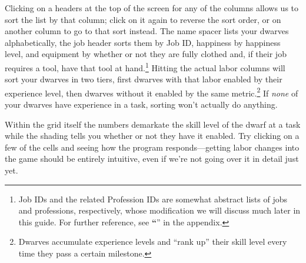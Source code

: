 \documentclass[]{article}
\newcommand{\jump}[1] {\textbf{``\nameref{sec:#1}}''}
\begin{document}
Clicking on a headers at the top of the screen for any of the columns allows us to sort the list by that
column; click on it again to reverse the sort order, or on another column to go to that sort instead.
The name spacer lists your dwarves alphabetically, the job header sorts them by Job ID, happiness by
happiness level, and equipment by whether or not they are fully clothed and,
if their job requires a tool, have that tool at hand.\footnote{\label{footnote} Job IDs and
the related Profession IDs are somewhat abstract lists of jobs and professions, respectively, whose
modification we will discuss much later in this guide. For further reference, see \jump{Profession IDs}
in the appendix.} Hitting the actual labor columns will sort your dwarves in two tiers, first dwarves
with that labor enabled by their experience level, then dwarves without it enabled by the same
metric.\footnote{Dwarves accumulate experience levels and ``rank up'' their skill level every time they
pass a certain milestone.} If \emph{none} of your dwarves have experience in a task, sorting won't
actually do anything.

Within the grid itself the numbers demarkate the skill level of the dwarf at a task while the shading
tells you whether or not they have it enabled. Try clicking on a few of the cells and seeing how the
program responds---getting labor changes into the game should be entirely intuitive, even if we're not
going over it in detail just yet.

\newpage
\end{document}
